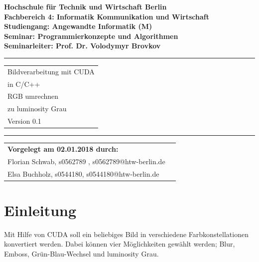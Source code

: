 \documentclass{llncs}
\begin{document}
	\lstset{language=c++, breaklines=true, frame=single}
\thispagestyle{empty}
\begin{flushleft}
\bfseries	Hochschule für Technik und Wirtschaft Berlin\\
	Fachbereich 4: Informatik Kommunikation und Wirtschaft \\
	Studiengang: Angewandte Informatik (M)\\
	Seminar: Programmierkonzepte und Algorithmen\\
	Seminarleiter: Prof. Dr. Volodymyr Brovkov\\ [2.5cm]
\end{flushleft}
\vspace{45pt}
\rule{\textwidth}{1pt}
\vspace{2pt}
\begin{flushright}
\Huge
\begin{tabular}{@{}l}
Bildverarbeitung mit CUDA\\ in C/C++\\
RGB umrechnen\\ zu luminosity Grau\\[6pt]
{\Large Version 0.1}
\end{tabular}
\end{flushright}
\rule{\textwidth}{1pt}
\vfill

\begin{flushleft}
\begin{tabular}{ll}
{\bfseries Vorgelegt am 02.01.2018 durch: }\\
Florian Schwab, s0562789 , s0562789@htw-berlin.de \\
Elsa Buchholz, s0544180, s0544180@htw-berlin.de \\
\end{tabular}
\end{flushleft}

%
\newpage
\tableofcontents
\newpage
%
\section{Einleitung}
%
Mit Hilfe von CUDA soll ein beliebiges Bild in verschiedene Farbkonstellationen konvertiert werden. Dabei können vier  Möglichkeiten gewählt werden; Blur, Emboss, Grün-Blau-Wechsel und luminosity Grau.\\
\end{document}
